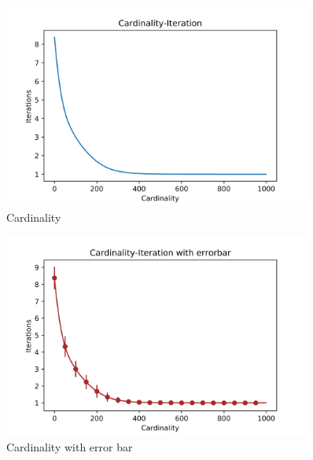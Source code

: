 \documentclass[a4paper,12pt]{article}
\begin{document}
    \begin{figure}[H]
    	\centering
    	\includegraphics[width=0.9\textwidth]{Card50_4_1000_1500}
    	\caption{Cardinality}\label{Card50_4_1000_1500}
    \end{figure}
    \begin{figure}[H]
    	\centering
    	\includegraphics[width=0.9\textwidth]{CardErr50_4_1000_1500}
    	\caption{Cardinality with error bar}\label{CardErr50_4_1000_1500}
    \end{figure}
\end{document}

